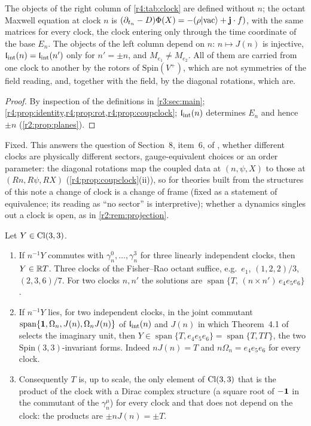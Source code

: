 \begin{proposition}
\label{r4:prop:clockdep}
The objects of the right column of \cref{r4:tab:clock} are defined without $n$; the octant Maxwell equation at clock $n$ is
$(\partial_{t_n}-D)\Phi(X)=-(\rho|\mathrm{vac}\rangle+\mathbf j\cdot f)$, with the same matrices for every clock, the clock entering only through the time coordinate of the
base $E_n$. The objects of the left column depend on $n$: $n\mapsto J(n)$ is injective, $\mathfrak l_{\rm int}(n)=\mathfrak l_{\rm int}(n')$ only for $n'=\pm n$, and $M_{e_1}\neq M_{e_2}$. All of
them are carried from one clock to another by the rotors of $\mathrm{Spin}(V^+)$, which are not symmetries of the field reading, and, together with the field,
by the diagonal rotations, which are.
\end{proposition}

\begin{proof}
By inspection of the definitions in \cref{r3:sec:main}; \cref{r4:prop:identity,r4:prop:rot,r4:prop:coupclock}; $\mathfrak l_{\rm int}(n)$ determines $E_n$ and hence $\pm n$ (\cref{r2:prop:planes}).
\end{proof}

Fixed. This answers the question of Section~8, item~6, of \cite{FMB}, whether different clocks are physically different sectors, gauge-equivalent
choices or an order parameter: the diagonal rotations map the coupled data at $(n,\psi,X)$ to those at $(Rn,R\psi,RX)$ (\cref{r4:prop:coupclock}(ii)), so for
theories built from the structures of this note a change of clock is a change of frame (fixed as a statement of equivalence; its reading as ``no
sector'' is interpretive); whether a dynamics singles out a clock is open, as in \cref{r2:rem:projection}.

\begin{theorem}[Uniqueness of $T$]
\label{r4:thm:unique}
Let $Y\in\mathrm{Cl}(3,3)$.
\begin{enumerate}[label=(\roman*),leftmargin=2.2em]
\item If $n^{-1}Y$ commutes with $\gamma^0_n,\dots,\gamma^3_n$ for three linearly independent clocks, then $Y\in\mathbb{R} T$. Three clocks of the Fisher--Rao octant suffice,
e.g.\ $e_1$, $(1,2,2)/3$, $(2,3,6)/7$. For two clocks $n,n'$ the solutions are $\operatorname{span}\{T,\,(n\times n')\,e_4e_5e_6\}$.
\item If $n^{-1}Y$ lies, for two independent clocks, in the joint commutant $\operatorname{span}\{\mathbf 1,\Omega_n,J(n),\Omega_nJ(n)\}$ of $\mathfrak l_{\rm int}(n)$ and $J(n)$ in which Theorem~4.1 of
\cite{ES17} selects the imaginary unit, then $Y\in\operatorname{span}\{T,e_4e_5e_6\}=\operatorname{span}\{T,T\Gamma\}$, the two $\mathrm{Spin}(3,3)$-invariant forms. Indeed $nJ(n)=T$ and
$n\Omega_n=e_4e_5e_6$ for every clock.
\item Consequently $T$ is, up to scale, the only element of $\mathrm{Cl}(3,3)$ that is the product of the clock with a Dirac complex structure (a square root of $-\mathbf 1$ in
the commutant of the $\gamma^\mu_n$) for every clock and that does not depend on the clock: the products are $\pm nJ(n)=\pm T$.
\end{enumerate}
\end{theorem}

